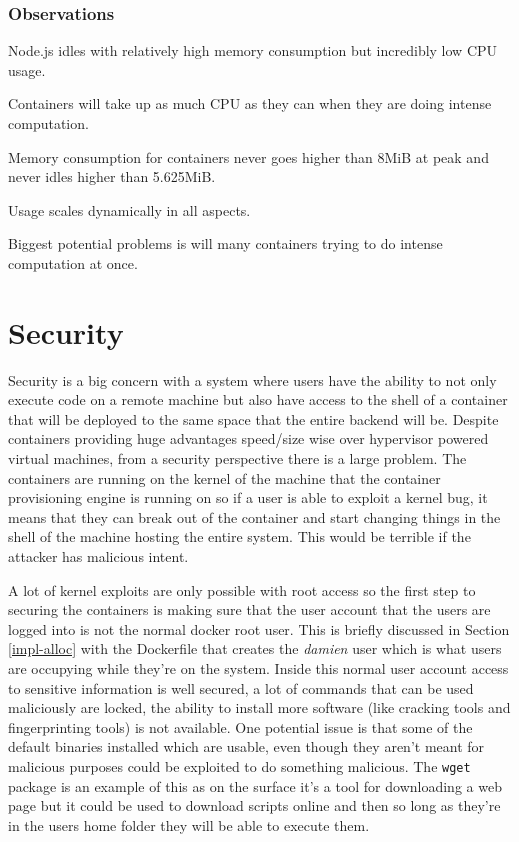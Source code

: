 \subsubsection{Observations}

Node.js idles with relatively high memory consumption but incredibly low CPU usage. 

Containers will take up as much CPU as they can when they are doing intense computation.

Memory consumption for containers never goes higher than 8MiB at peak and never idles higher than 5.625MiB.

Usage scales dynamically in all aspects.

Biggest potential problems is will many containers trying to do intense computation at once.

\section{Security}


Security is a big concern with a system where users have the ability to not only execute code on a remote machine but also have access to the shell of a container that will be deployed to the same space that the entire backend will be. Despite containers providing huge advantages speed/size wise over hypervisor powered virtual machines, from a security perspective there is a large problem. The containers are running on the kernel of the machine that the container provisioning engine is running on so if a user is able to exploit a kernel bug, it means that they can break out of the container and start changing things in the shell of the machine hosting the entire system. This would be terrible if the attacker has malicious intent.

A lot of kernel exploits are only possible with root access so the first step to securing the containers is making sure that the user account that the users are logged into is not the normal docker root user. This is briefly discussed in Section \ref{impl-alloc} with the Dockerfile that creates the \textit{damien} user which is what users are occupying while they're on the system. Inside this normal user account access to sensitive information is well secured, a lot of commands that can be used maliciously are locked, the ability to install more software (like cracking tools and fingerprinting tools) is not available. One potential issue is that some of the default binaries installed which are usable, even though they aren't meant for malicious purposes could be exploited to do something malicious. The \texttt{wget} package is an example of this as on the surface it's a tool for downloading a web page but it could be used to download scripts online and then so long as they're in the users home folder they will be able to execute them. 

